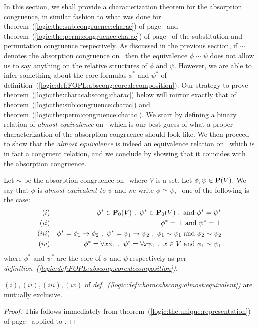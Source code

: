 In this section, we shall provide a characterization theorem for the
absorption congruence, in similar fashion to what was done for
theorem~(\ref{logic:the:sub:congruence:charac}) of
page~\pageref{logic:the:sub:congruence:charac} and
theorem~(\ref{logic:the:perm:congruence:charac}) of
page~\pageref{logic:the:perm:congruence:charac} of the substitution
and permutation congruence respectively. As discussed in the
previous section, if $\sim$ denotes the absorption congruence on
\pv\ then the equivalence $\phi\sim\psi$ does not allow us to say
anything on the relative structures of $\phi$ and $\psi$. However,
we are able to infer something about the core formulas $\phi^{*}$
and $\psi^{*}$ of
definition~(\ref{logic:def:FOPL:abscong:core:decomposition}). Our
strategy to prove theorem~(\ref{logic:the:characabscong:charac})
below will mirror exactly that of
theorem~(\ref{logic:the:sub:congruence:charac}) and
theorem~(\ref{logic:the:perm:congruence:charac}). We start by
defining a binary relation of {\em almost equivalence} on \pv\ which
is our best guess of what a proper characterization of the
absorption congruence should look like. We then proceed to show that
the {\em almost equivalence} is indeed an equivalence relation on
\pv\ which is in fact a congruent relation, and we conclude by
showing that it coincides with the absorption congruence.

\begin{defin}\label{logic:def:characabscong:almost:equivalent}
Let $\sim$ be the absorption congruence on \pv\ where $V$ is a set.
Let $\phi,\psi\in\mbox{${\bf P}(V)$}$. We say that $\phi$ is {\em almost equivalent
to $\psi$} and we write $\phi\simeq\psi$, \ifand\ one of the
following is the case:
    \begin{eqnarray*}
    (i)&&\phi^{*}\in\pvo\ ,\ \psi^{*}\in\pvo\ ,\ \mbox{and}\ \phi^{*}=\psi^{*}\\
    (ii)&&\phi^{*}=\bot\ \mbox{and}\ \psi^{*}=\bot\\
    (iii)&&\phi^{*}=\phi_{1}\to\phi_{2}\ ,\ \psi^{*}=\psi_{1}\to\psi_{2}\ ,\
    \phi_{1}\sim\psi_{1}\ \mbox{and}\ \phi_{2}\sim\psi_{2}\\
    (iv)&&\phi^{*}=\forall x\phi_{1}\ ,\ \psi^{*}=\forall x\psi_{1}\ ,\ x\in V\
    \mbox{and}\ \phi_{1}\sim\psi_{1}\\
    \end{eqnarray*}
where $\phi^{*}$ and $\psi^{*}$ are the core of $\phi$ and $\psi$
respectively as per {\em
definition~(\ref{logic:def:FOPL:abscong:core:decomposition})}.
\end{defin}
\begin{prop}
$(i),(ii),(iii),(iv)$ of {\em
def.~(\ref{logic:def:characabscong:almost:equivalent})} are mutually
exclusive.
\end{prop}
\begin{proof}
This follows immediately from
theorem~(\ref{logic:the:unique:representation}) of
page~\pageref{logic:the:unique:representation} applied to \pv.
\end{proof}

